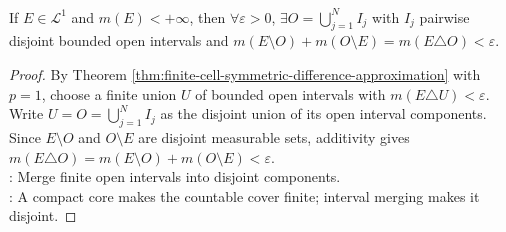 \begin{corollary} \label{cor:real-line-finite-open-interval-approximation} \\
If $E\in\mathcal{L}^1$ and $m(E)<+\infty$, then $\forall\varepsilon>0$, $\exists O=\bigcup\limits_{j=1}^{N}I_j$ with $I_j$ pairwise disjoint bounded open intervals and $m(E\setminus O)+m(O\setminus E)=m(E\triangle O)<\varepsilon$.
\begin{proof}
By Theorem \ref{thm:finite-cell-symmetric-difference-approximation} with $p=1$, choose a finite union $U$ of bounded open intervals with $m(E\triangle U)<\varepsilon$. Write $U=O=\bigcup\limits_{j=1}^{N}I_j$ as the disjoint union of its open interval components.\\
Since $E\setminus O$ and $O\setminus E$ are disjoint measurable sets, additivity gives $m(E\triangle O)=m(E\setminus O)+m(O\setminus E)<\varepsilon$.\\
: Merge finite open intervals into disjoint components.\\
: A compact core makes the countable cover finite; interval merging makes it disjoint.
\end{proof}
\end{corollary}
